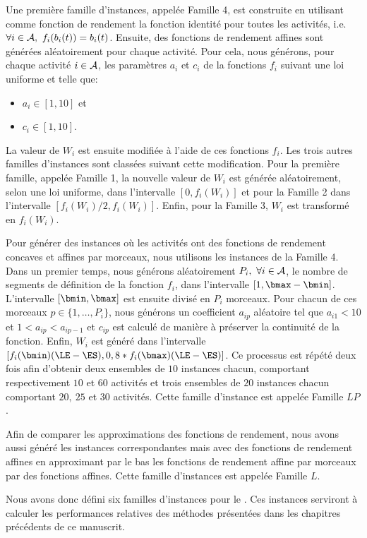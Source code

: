 Une première famille d'instances, appelée Famille 4, est construite en
utilisant comme fonction de rendement la fonction identité pour toutes
les activités, i.e. $\forall i \in \A,\ f_i(b_i(t))= b_i(t)$. Ensuite,
des fonctions de rendement affines sont générées aléatoirement pour
chaque activité. Pour cela, nous générons, pour chaque activité $i \in
{\cal A}$, les paramètres $a_i$ et $c_i$ de la fonctions $f_i$ suivant une
loi uniforme et telle que:
\begin{itemize}
\item $a_i \in [1,10]$ et
\item $c_i \in [1,10]$.
\end{itemize} La valeur de $W_i$ est ensuite modifiée à l'aide de ces
fonctions $f_i$. Les trois autres familles d'instances sont classées
suivant cette modification. Pour la première famille, appelée Famille
1, la nouvelle valeur de $W_i$ est générée aléatoirement, selon une
loi uniforme, dans l'intervalle $[0,f_i(W_i)]$ et pour la Famille 2
dans l'intervalle $[f_i(W_i)/2, f_i(W_i)]$. Enfin, pour la Famille 3,
$W_i$ est transformé en $f_i(W_i)$. 

Pour générer des instances où les activités ont des fonctions de
rendement concaves et affines par morceaux, nous utilisons les
instances de la Famille 4. Dans un premier temps, nous générons
aléatoirement $P_i,\ \forall i \in {\cal A}$, le nombre de segments de
définition de la fonction $f_i$, dans l'intervalle $[1 ,\bmax -
\bmin]$. L'intervalle $[\bmin,\bmax]$ est ensuite divisé en $P_i$
morceaux. Pour chacun de ces morceaux $ p \in \{1,\dots,P_i\}$, nous
générons un coefficient $a_{ip}$ aléatoire tel que $a_{i1}<10$ et $1 <
a_{ip} < a_{ip-1}$ et $c_{ip}$ est calculé de manière à préserver la
continuité de la fonction. Enfin, $W_i$ est généré dans l'intervalle
$[f_i(\bmin)(\LE-\ES), 0,8*f_i(\bmax)(\LE-\ES)]$. Ce processus est
répété deux fois afin d'obtenir deux ensembles de $10$ instances
chacun, comportant respectivement $10$ et $60$ activités et trois
ensembles de $20$ instances chacun comportant $20,\ 25$ et $30$
activités. Cette famille d'instance est appelée Famille $LP$.
 
Afin de comparer les approximations des fonctions de rendement, nous
avons aussi généré les instances correspondantes mais avec des
fonctions de rendement affines en approximant par le bas les fonctions de
rendement affine par morceaux par des fonctions affines. Cette famille
d'instances est appelée Famille $L$. 

Nous avons donc défini six familles d'instances pour le \CECSP. Ces
instances serviront à calculer les performances relatives des méthodes
présentées dans les chapitres précédents de ce manuscrit. 

